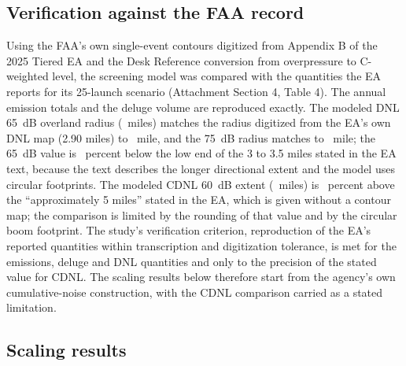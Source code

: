 \documentclass[11pt]{article}
\begin{document}
\subsection{Verification against the FAA record}

Using the FAA's own single-event contours digitized from Appendix B of the 2025 Tiered EA and the Desk Reference conversion from overpressure to C-weighted level, the screening model was compared with the quantities the EA reports for its 25-launch scenario (Attachment Section 4, Table 4). The annual emission totals and the deluge volume are reproduced exactly. The modeled DNL 65~dB overland radius (\valVerifDnlSixFiveDbContourExtentMiles~miles) matches the radius digitized from the EA's own DNL map (2.90 miles) to \valVerifDnlSixFiveVsDigitizedMiles~mile, and the 75~dB radius matches to \valVerifDnlSevenFiveVsDigitizedMiles~mile; the 65~dB value is \valVerifDnlSixFiveBelowLowEndPct~percent below the low end of the 3 to 3.5 miles stated in the EA text, because the text describes the longer directional extent and the model uses circular footprints. The modeled CDNL 60~dB extent (\valVerifCdnlSixZeroDbContourExtentMiles~miles) is \valVerifCdnlSixZeroAboveStatedPct~percent above the ``approximately 5 miles'' stated in the EA, which is given without a contour map; the comparison is limited by the rounding of that value and by the circular boom footprint. The study's verification criterion, reproduction of the EA's reported quantities within transcription and digitization tolerance, is met for the emissions, deluge and DNL quantities and only to the precision of the stated value for CDNL. The scaling results below therefore start from the agency's own cumulative-noise construction, with the CDNL comparison carried as a stated limitation.

\subsection{Scaling results}
\end{document}
